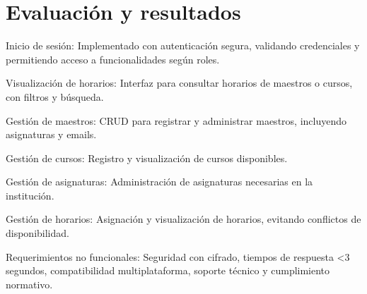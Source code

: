 \section{Evaluación y resultados}
Inicio de sesión: Implementado con autenticación segura, validando credenciales y permitiendo acceso a funcionalidades según roles.

Visualización de horarios: Interfaz para consultar horarios de maestros o cursos, con filtros y búsqueda.

Gestión de maestros: CRUD para registrar y administrar maestros, incluyendo asignaturas y emails.

Gestión de cursos: Registro y visualización de cursos disponibles.

Gestión de asignaturas: Administración de asignaturas necesarias en la institución.

Gestión de horarios: Asignación y visualización de horarios, evitando conflictos de disponibilidad.

Requerimientos no funcionales: Seguridad con cifrado, tiempos de respuesta <3 segundos, compatibilidad multiplataforma, soporte técnico y cumplimiento normativo.
